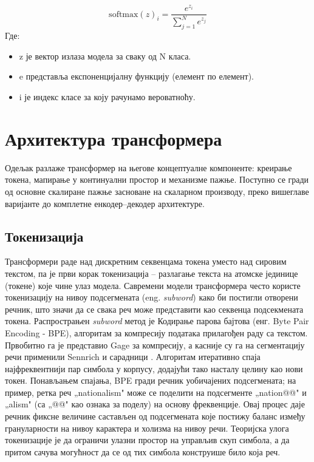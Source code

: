 \begin{equation}
    \label{eq:ss}
    \text{softmax}(z)_i = \frac{e^{z_i}}{\sum_{j=1}^{N} e^{z_j}}
\end{equation}
\newline
\newline
Где:

\begin{itemize}
    \item z је вектор излаза модела за сваку од N класа.
    \item e представља експоненцијалну функцију (елемент по елемент).
    \item i је индекс класе за коју рачунамо вероватноћу.
\end{itemize}

\section{Архитектура трансформера}
\label{sec:transformer}

Одељак разлаже трансформер на његове концептуалне компоненте: креирање токена, мапирање у континуални простор и механизме пажње. Поступно се гради од основне скалиране пажње засноване на скаларном производу, преко вишеглаве варијанте до комплетне енкодер–декодер архитектуре.

\subsection{Токенизација}

Трансформери раде над дискретним секвенцама токена уместо над сировим текстом, па је први корак токенизација -- разлагање текста на атомске јединице (токене) које чине улаз модела. Савремени модели трансформера често користе токенизацију на нивоу подсегмената (eng. \textit{subword}) како би постигли отворени речник, што значи да се свака реч може представити као секвенца подсекмената токена. Распрострањен \textit{subword} метод је Кодирање парова бајтова (енг. Byte Pair Encoding - BPE), алгоритам за компресију података прилагођен раду са текстом. Првобитно га је представио Gage за компресију, а касније су га на сегментацију речи применили Sennrich и сарадници \cite{gage_new_1994,sennrich_neural_2016}. Алгоритам итеративно спаја најфреквентнији пар симбола у корпусу, додајући тако насталу целину као нови токен. Понављањем спајања, BPE гради речник уобичајених подсегмената; на пример, ретка реч „nationalism" може се поделити на подсегменте „nation@@" и „alism" (са „@@" као ознака за поделу) на основу фреквенције. Овај процес даје речник фиксне величине састављен од подсегмената које постижу баланс између грануларности на нивоу карактера и холизма на нивоу речи. Теоријска улога токенизације је да ограничи улазни простор на управљив скуп симбола, а да притом сачува могућност да се од тих симбола конструише било која реч.

